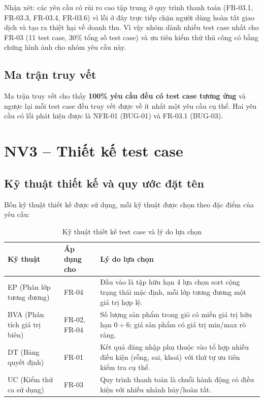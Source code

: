 \documentclass[12pt,a4paper]{article}
\newcommand{\tablestyle}{\small\renewcommand{\arraystretch}{1.25}}
\newcommand{\hrow}{\rowcolor{tablehead}}
\begin{document}


Nhận xét: các yêu cầu có rủi ro cao tập trung ở quy trình thanh toán (FR-03.1, FR-03.3,
FR-03.4, FR-03.6) vì lỗi ở đây trực tiếp chặn người dùng hoàn tất giao dịch và tạo ra thiệt
hại về doanh thu. Vì vậy nhóm dành nhiều test case nhất cho FR-03 (11 test case, 30\% tổng
số test case) và ưu tiên kiểm thử thủ công có bằng chứng hình ảnh cho nhóm yêu cầu này.

\subsection{Ma trận truy vết}


Ma trận truy vết cho thấy \textbf{100\% yêu cầu đều có test case tương ứng} và ngược lại mỗi
test case đều truy vết được về ít nhất một yêu cầu cụ thể. Hai yêu cầu có lỗi phát hiện được
là NFR-01 (BUG-01) và FR-03.1 (BUG-03).

\section{NV3 -- Thiết kế test case}

\subsection{Kỹ thuật thiết kế và quy ước đặt tên}
Bốn kỹ thuật thiết kế được sử dụng, mỗi kỹ thuật được chọn theo đặc điểm của yêu cầu:

\begin{table}[H]
\centering
\tablestyle
\caption{Kỹ thuật thiết kế test case và lý do lựa chọn}
\label{tab:tech}
\begin{tabularx}{\textwidth}{L{3.6cm}L{2.6cm}Y}
\toprule
\hrow \textbf{Kỹ thuật} & \textbf{Áp dụng cho} & \textbf{Lý do lựa chọn} \\
\midrule
EP (Phân lớp tương đương) & FR-04 & Đầu vào là tập hữu hạn 4 lựa chọn sort cộng trạng thái mặc định, mỗi lớp tương đương một giá trị hợp lệ. \\
BVA (Phân tích giá trị biên) & FR-02, FR-04 & Số lượng sản phẩm trong giỏ có miền giá trị hữu hạn $0 \div 6$; giá sản phẩm có giá trị min/max rõ ràng. \\
DT (Bảng quyết định) & FR-01 & Kết quả đăng nhập phụ thuộc vào tổ hợp nhiều điều kiện (rỗng, sai, khoá) với thứ tự ưu tiên kiểm tra cụ thể. \\
UC (Kiểm thử ca sử dụng) & FR-03 & Quy trình thanh toán là chuỗi hành động có điều kiện với nhiều nhánh hủy/hoàn tất. \\
\bottomrule
\end{tabularx}
\end{table}
\end{document}
